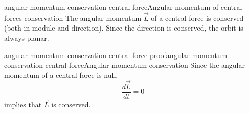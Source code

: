 \documentclass[preview]{standalone}
\begin{document}
\begin{snippetcorollary}{angular-momentum-conservation-central-force}{Angular momentum of central forces conservation}
    The angular momentum \(\vec{L}\) of a central force is conserved (both in module and direction).
    Since the direction is conserved, the orbit is always planar.
\end{snippetcorollary}

\begin{snippetproof}{angular-momentum-conservation-central-force-proof}{angular-momentum-conservation-central-force}{Angular momentum conservation}
    Since the angular momentum of a central force is null,
    \[
        \frac{d\vec{L}}{dt} = 0
    \]
    implies that \(\vec{L}\) is conserved.
\end{snippetproof}

\end{document}
